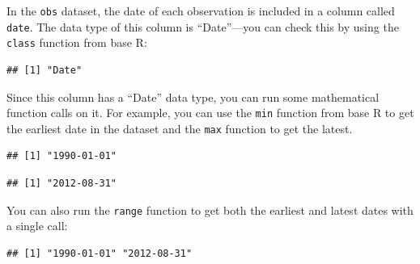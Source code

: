 \documentclass[
]{book}
\newenvironment{Shaded}{\begin{snugshade}}{\end{snugshade}}
\newcommand{\KeywordTok}[1]{\textcolor[rgb]{0.13,0.29,0.53}{\textbf{#1}}}
\newcommand{\NormalTok}[1]{#1}
\newcommand{\OperatorTok}[1]{\textcolor[rgb]{0.81,0.36,0.00}{\textbf{#1}}}
\begin{document}
In the \texttt{obs} dataset, the date of each observation is included in a column called
\texttt{date}. The data type of this column is ``Date''---you can check this by using
the \texttt{class} function from base R:

\begin{Shaded}
\end{Shaded}

\begin{verbatim}
## [1] "Date"
\end{verbatim}

Since this column has a ``Date'' data type, you can run some mathematical function
calls on it. For example, you can use the \texttt{min} function from base R to get the
earliest date in the dataset and the \texttt{max} function to get the latest.

\begin{Shaded}
\end{Shaded}

\begin{verbatim}
## [1] "1990-01-01"
\end{verbatim}

\begin{Shaded}
\end{Shaded}

\begin{verbatim}
## [1] "2012-08-31"
\end{verbatim}

You can also run the \texttt{range} function to get both the earliest and latest dates
with a single call:

\begin{Shaded}
\end{Shaded}

\begin{verbatim}
## [1] "1990-01-01" "2012-08-31"
\end{verbatim}
\end{document}
